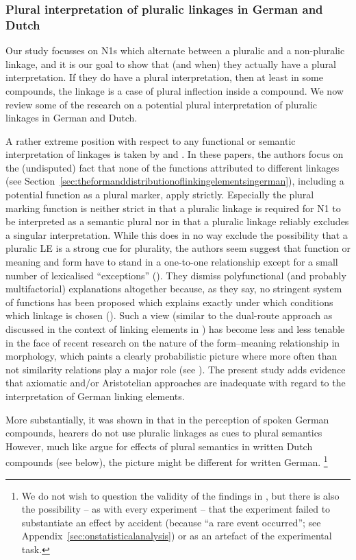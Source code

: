\subsubsection{Plural interpretation of pluralic linkages in German and Dutch}

Our study focusses on N1s which alternate between a pluralic and a non-pluralic linkage, and it is our goal to show that (and when) they actually have a plural interpretation.
If they do have a plural interpretation, then at least in some compounds, the linkage is a case of plural inflection inside a compound.
We now review some of the research on a potential plural interpretation of pluralic linkages in German and Dutch.

A rather extreme position with respect to any functional or semantic interpretation of linkages is taken by \textcite{NeefBorgwaldt2012} and \textcite{Neef2015}.
In these papers, the authors focus on the (undisputed) fact that none of the functions attributed to different linkages (see Section~\ref{sec:theformanddistributionoflinkingelementsingerman}), including a potential function as a plural marker, apply strictly.
Especially the plural marking function is neither strict in that a pluralic linkage is required for N1 to be interpreted as a semantic plural nor in that a pluralic linkage reliably excludes a singular interpretation.
While this does in no way exclude the possibility that a pluralic LE is a strong cue for plurality, the authors seem suggest that function or meaning and form have to stand in a one-to-one relationship except for a small number of lexicalised ``exceptions'' (\egg \citealt[42]{NeefBorgwaldt2012}).
They dismiss polyfunctional (and probably multifactorial) explanations altogether because, as they say, no stringent system of functions has been proposed which explains exactly under which conditions which linkage is chosen (\egg \citealt[27--29]{NeefBorgwaldt2012}).
Such a view (similar to the dual-route approach as discussed in the context of linking elements in \citealt{KrottEa2007}) has become less and less tenable in the face of recent research on the nature of the form--meaning relationship in morphology, which paints a clearly probabilistic picture where more often than not similarity relations play a major role (see \citealt[107]{ArndtlappeEa2016}).
The present study adds evidence that axiomatic and\slash or Aristotelian approaches are inadequate with regard to the interpretation of German linking elements.

More substantially, it was shown in \textcite{KoesterEa2004} that in the perception of spoken German compounds, hearers do not use pluralic linkages as cues to plural semantics
However, much like \textcite{SchreuderEa1998} argue for effects of plural semantics in written Dutch compounds (see below), the picture might be different for written German.%
\footnote{We do not wish to question the validity of the findings in \textcite{KoesterEa2004}, but there is also the possibility -- as with every experiment -- that the experiment failed to substantiate an effect by accident (because ``a rare event occurred''; see Appendix~\ref{sec:onstatisticalanalysis}) or as an artefact of the experimental task.}

